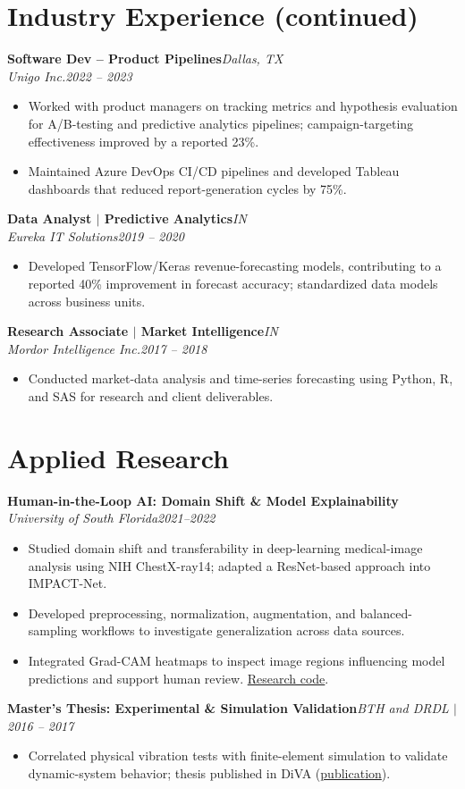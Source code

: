 \documentclass[10pt,a4paper]{article}
\newcommand{\job}[4]{\textbf{#1}\hfill\textit{#2}\\\textit{#3}\hfill\textit{#4}\par\vspace{-3pt}}
\begin{document}
\section{Industry Experience (continued)}
\job{Software Dev -- Product Pipelines}{Dallas, TX}{Unigo Inc.}{2022 -- 2023}
\begin{itemize}\item Worked with product managers on tracking metrics and hypothesis evaluation for A/B-testing and predictive analytics pipelines; campaign-targeting effectiveness improved by a reported 23\%.\item Maintained Azure DevOps CI/CD pipelines and developed Tableau dashboards that reduced report-generation cycles by 75\%.\end{itemize}
\job{Data Analyst $|$ Predictive Analytics}{IN}{Eureka IT Solutions}{2019 -- 2020}
\begin{itemize}\item Developed TensorFlow/Keras revenue-forecasting models, contributing to a reported 40\% improvement in forecast accuracy; standardized data models across business units.\end{itemize}
\job{Research Associate $|$ Market Intelligence}{IN}{Mordor Intelligence Inc.}{2017 -- 2018}
\begin{itemize}\item Conducted market-data analysis and time-series forecasting using Python, R, and SAS for research and client deliverables.\end{itemize}
\section{Applied Research}
\textbf{Human-in-the-Loop AI: Domain Shift \& Model Explainability}\\\textit{University of South Florida}\hfill\textit{2021--2022}
\begin{itemize}\item Studied domain shift and transferability in deep-learning medical-image analysis using NIH ChestX-ray14; adapted a ResNet-based approach into IMPACT-Net.\item Developed preprocessing, normalization, augmentation, and balanced-sampling workflows to investigate generalization across data sources.\item Integrated Grad-CAM heatmaps to inspect image regions influencing model predictions and support human review. \href{https://github.com/shivkammadari23/Image-Classification-Deep-Learning-Researchstudy.git}{Research code}.\end{itemize}
\textbf{Master's Thesis: Experimental \& Simulation Validation}\hfill\textit{BTH and DRDL $|$ 2016 -- 2017}
\begin{itemize}\item Correlated physical vibration tests with finite-element simulation to validate dynamic-system behavior; thesis published in DiVA (\href{http://bth.diva-portal.org/smash/record.jsf?pid=diva2:1131591}{publication}).\end{itemize}
\end{document}
